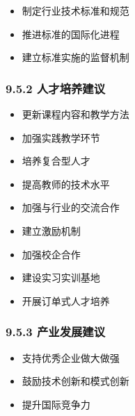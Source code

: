 
\begin{itemize}
\tightlist
\item
  制定行业技术标准和规范
\item
  推进标准的国际化进程
\item
  建立标准实施的监督机制
\end{itemize}

\hypertarget{ux4ebaux624dux57f9ux517bux5efaux8bae}{%
\subsubsection{9.5.2 人才培养建议}\label{ux4ebaux624dux57f9ux517bux5efaux8bae}}


\begin{itemize}
\tightlist
\item
  更新课程内容和教学方法
\item
  加强实践教学环节
\item
  培养复合型人才
\end{itemize}


\begin{itemize}
\tightlist
\item
  提高教师的技术水平
\item
  加强与行业的交流合作
\item
  建立激励机制
\end{itemize}


\begin{itemize}
\tightlist
\item
  加强校企合作
\item
  建设实习实训基地
\item
  开展订单式人才培养
\end{itemize}

\hypertarget{ux4ea7ux4e1aux53d1ux5c55ux5efaux8bae}{%
\subsubsection{9.5.3 产业发展建议}\label{ux4ea7ux4e1aux53d1ux5c55ux5efaux8bae}}


\begin{itemize}
\tightlist
\item
  支持优秀企业做大做强
\item
  鼓励技术创新和模式创新
\item
  提升国际竞争力
\end{itemize}

